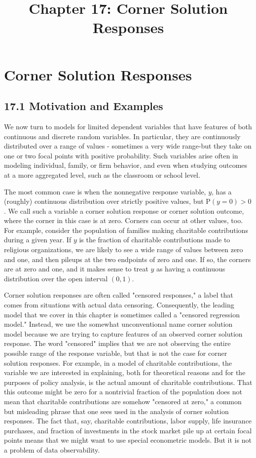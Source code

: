 \documentclass[10pt]{article}
\title{Chapter 17: Corner Solution Responses}
\author{}
\date{}
\begin{document}
\maketitle

\section*{Corner Solution Responses}
\subsection*{17.1 Motivation and Examples}
We now turn to models for limited dependent variables that have features of both continuous and discrete random variables. In particular, they are continuously distributed over a range of values - sometimes a very wide range-but they take on one or two focal points with positive probability. Such variables arise often in modeling individual, family, or firm behavior, and even when studying outcomes at a more aggregated level, such as the classroom or school level.

The most common case is when the nonnegative response variable, $y$, has a (roughly) continuous distribution over strictly positive values, but $\mathrm{P}(y=0)>0$. We call such a variable a corner solution response or corner solution outcome, where the corner in this case is at zero. Corners can occur at other values, too. For example, consider the population of families making charitable contributions during a given year. If $y$ is the fraction of charitable contributions made to religious organizations, we are likely to see a wide range of values between zero and one, and then pileups at the two endpoints of zero and one. If so, the corners are at zero and one, and it makes sense to treat $y$ as having a continuous distribution over the open interval $(0,1)$.

Corner solution responses are often called "censored responses," a label that comes from situations with actual data censoring. Consequently, the leading model that we cover in this chapter is sometimes called a "censored regression model." Instead, we use the somewhat unconventional name corner solution model because we are trying to capture features of an observed corner solution response. The word "censored" implies that we are not observing the entire possible range of the response variable, but that is not the case for corner solution responses. For example, in a model of charitable contributions, the variable we are interested in explaining, both for theoretical reasons and for the purposes of policy analysis, is the actual amount of charitable contributions. That this outcome might be zero for a nontrivial fraction of the population does not mean that charitable contributions are somehow "censored at zero," a common but misleading phrase that one sees used in the analysis of corner solution responses. The fact that, say, charitable contributions, labor supply, life insurance purchases, and fraction of investments in the stock market pile up at certain focal points means that we might want to use special econometric models. But it is not a problem of data observability.
\end{document}
